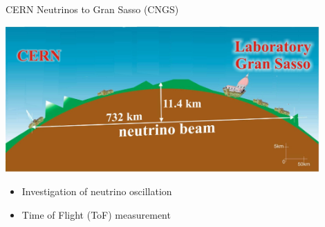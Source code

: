 \documentclass[compress,red]{beamer}
\begin{document}
\subsection{}
\begin{frame}{CERN Neutrinos to Gran Sasso (CNGS)}

    \begin{center}
      \includegraphics[width=0.9\textwidth]{applications/cngs-general.pdf}
    \end{center}

    \begin{center}
      \begin{itemize}
	\item Investigation of neutrino oscillation
	\item Time of Flight (ToF) measurement
      \end{itemize}

    \end{center}


\end{frame}
\end{document}
